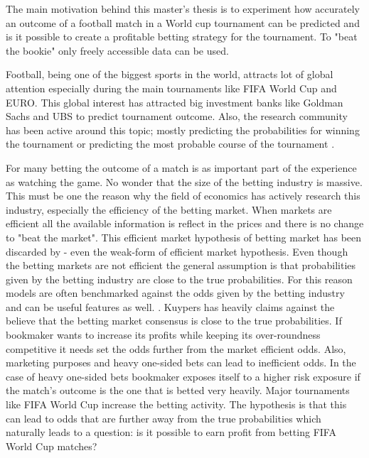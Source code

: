 The main motivation behind this master's thesis is to experiment how accurately an outcome of a football match in a World cup tournament can be predicted and is it possible to create a profitable betting strategy for the tournament. To "beat the bookie" only freely accessible data can be used.

Football, being one of the biggest sports in the world, attracts lot of global attention especially during the main tournaments like FIFA World Cup and EURO. This global interest has attracted big investment banks like Goldman Sachs and UBS to predict tournament outcome. Also, the research community has been active around this topic; mostly predicting the probabilities for winning the tournament or predicting the most probable course of the tournament \cite{groll2018prediction, groll2015prediction, leitner2010forecasting}.

For many betting the outcome of a match is as important part of the experience as watching the game. No wonder that the size of the betting industry is massive. This must be one the reason why the field of economics has actively research this industry, especially the efficiency of the betting market. When markets are efficient all the available information is reflect in the prices and there is no change to "beat the market". This efficient market hypothesis of betting market has been discarded by \cite{vlastakis2009efficient} - even the weak-form of efficient market hypothesis. Even though the betting markets are not efficient the general assumption is that probabilities given by the betting industry are close to the true probabilities. For this reason models are often benchmarked against the odds given by the betting industry and can be useful features as well. \cite{leitner2010forecasting}. Kuypers \cite{kuypers2008} has heavily claims against the believe that the betting market consensus is close to the true probabilities. If bookmaker wants to increase its profits while keeping its over-roundness competitive it needs set the odds further from the market efficient odds. Also, marketing purposes and heavy one-sided bets can lead to inefficient odds. In the case of heavy one-sided bets bookmaker exposes itself to a higher risk exposure if the match's outcome is the one that is betted very heavily. Major tournaments like FIFA World Cup increase the betting activity. The hypothesis is that this can lead to odds that are further away from the true probabilities which naturally leads to a question: is it possible to earn profit from betting FIFA World Cup matches?

